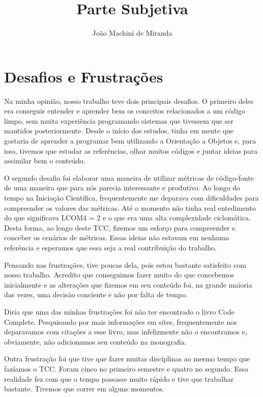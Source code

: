 \documentclass[a4paper, 11pt]{article}
\begin{document}
\onehalfspacing 


\title{Parte Subjetiva}
\author{João Machini de Miranda}
\maketitle

\section{Desafios e Frustrações}
Na minha opinião, nosso trabalho teve dois principais desafios. O primeiro deles era conseguir entender e
aprender bem os conceitos relacionados a um código limpo, sem muita experiência programando sistemas que tivessem
que ser mantidos posteriormente. Desde o início dos estudos, tinha em mente que gostaria de aprender a programar
bem utilizando a Orientação a Objetos e, para isso, tivemos que estudar as referências, olhar muitos códigos e juntar
ideias para assimilar bem o conteúdo.

O segundo desafio foi elaborar uma maneira de utilizar métricas de código-fonte de uma maneira que para nós parecia
interessante e produtivo. Ao longo do tempo na Iniciação Científica, frequentemente me deparava com dificuldades para
compreender os valores das métricas. Até o momento não tinha real entedimento do que significava LCOM4 = 2 e o que era
uma alta complexidade ciclomática. Desta forma, ao longo deste TCC, fizemos um esforço para compreender e conceber os
cenários de métricas. Essas ideias não estavam em nenhuma referência e esperamos que essa seja a real contribuição do trabalho.

Pensando nas frustrações, tive poucas dela, pois estou bastante satisfeito com nosso trabalho. Acredito que conseguimos fazer muito
do que concebemos inicialmente e as alterações que fizemos em seu conteúdo foi, na grande maioria das vezes, uma decisão conciente
e não por falta de tempo.

Diria que uma das minhas frustrações foi não ter encontrado o livro Code Complete. Pesquisando por mais informações em sites,
frequentemente nos deparavamos com citações a esse livro, mas infelizmente não o encontramos e, obviamente, não adicionamos seu
conteúdo na monografia.

Outra frustração foi que tive que fazer muitas disciplinas ao mesmo tempo que fazíamos o TCC. Foram cinco no primeiro semestre e
quatro no segundo. Essa realidade fez com que o tempo passasse muito rápido e tive que trabalhar bastante. Tivemos que correr
em alguns momentos.
\end{document}

